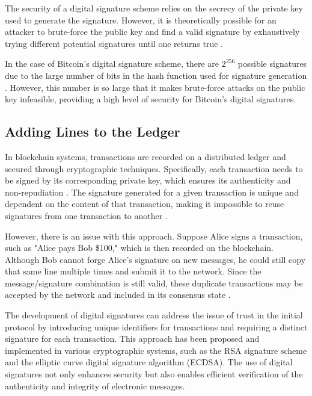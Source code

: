 The security of a digital signature scheme relies on the secrecy of the private key used to generate the signature. However, it is theoretically possible for an attacker to brute-force the public key and find a valid signature by exhaustively trying different potential signatures until one returns true \cite{boneh2001short}.

In the case of Bitcoin's digital signature scheme, there are $2^{256}$ possible signatures due to the large number of bits in the hash function used for signature generation \cite{dss}. However, this number is so large that it makes brute-force attacks on the public key infeasible, providing a high level of security for Bitcoin's digital signatures.

\subsection{Adding Lines to the Ledger}
In blockchain systems, transactions are recorded on a distributed ledger and secured through cryptographic techniques. Specifically, each transaction needs to be signed by its corresponding private key, which ensures its authenticity and non-repudiation \cite{stinson2018cryptography}. The signature generated for a given transaction is unique and dependent on the content of that transaction, making it impossible to reuse signatures from one transaction to another \cite{bruce1996applied}.

However, there is an issue with this approach. Suppose Alice signs a transaction, such as "Alice pays Bob \$100," which is then recorded on the blockchain. Although Bob cannot forge Alice's signature on new messages, he could still copy that same line multiple times and submit it to the network. Since the message/signature combination is still valid, these duplicate transactions may be accepted by the network and included in its consensus state \cite{swan2015blockchain}.

%

The development of digital signatures can address the issue of trust in the initial protocol by introducing unique identifiers for transactions and requiring a distinct signature for each transaction. This approach has been proposed and implemented in various cryptographic systems, such as the RSA signature scheme \cite{rivest1978method} and the elliptic curve digital signature algorithm (ECDSA). The use of digital signatures not only enhances security but also enables efficient verification of the authenticity and integrity of electronic messages.


